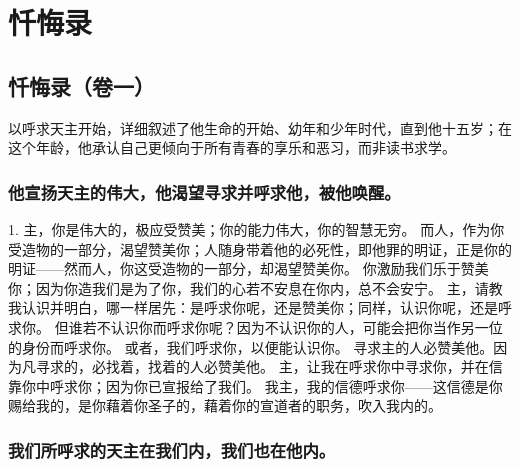 
\chapter{忏悔录}


\section{忏悔录（卷一）}

以呼求天主开始，详细叙述了他生命的开始、幼年和少年时代，直到他十五岁；在这个年龄，他承认自己更倾向于所有青春的享乐和恶习，而非读书求学。\par


\subsection{他宣扬天主的伟大，他渴望寻求并呼求他，被他唤醒。}

1. 主，你是伟大的，极应受赞美；你的能力伟大，你的智慧无穷。 而人，作为你受造物的一部分，渴望赞美你；人随身带着他的必死性，即他罪的明证，正是你的明证——然而人，你这受造物的一部分，却渴望赞美你。 你激励我们乐于赞美你；因为你造我们是为了你，我们的心若不安息在你内，总不会安宁。 主，请教我认识并明白，哪一样居先：是呼求你呢，还是赞美你；同样，认识你呢，还是呼求你。 但谁若不认识你而呼求你呢？因为不认识你的人，可能会把你当作另一位的身份而呼求你。 或者，我们呼求你，以便能认识你。  寻求主的人必赞美他。因为凡寻求的，必找着，找着的人必赞美他。 主，让我在呼求你中寻求你，并在信靠你中呼求你；因为你已宣报给了我们。 我主，我的信德呼求你——这信德是你赐给我的，是你藉着你圣子的，藉着你的宣道者的职务，吹入我内的。\par


\subsection{我们所呼求的天主在我们内，我们也在他内。}

